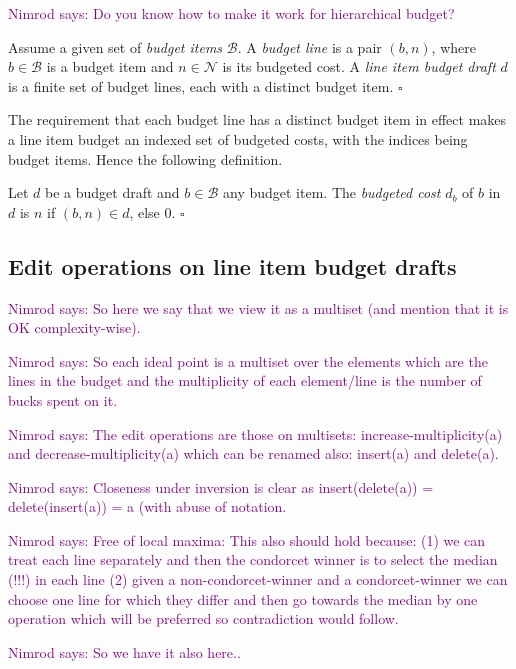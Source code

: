 \documentclass{llncs}
\newcommand{\nimrod}[1]{\textcolor{purple}{Nimrod says: #1}}
\newcommand{\qqed}{\hfill$\square$}
\newcommand{\calB}{\mathcal{B}}
\begin{document}
\nimrod{Do you know how to make it work for hierarchical budget?}

\begin{definition}
Assume a given set of \emph{budget items} $\calB$. A \emph{budget line} is a pair $(b,n)$, where $b \in \calB$ is a budget item and $n \in \mathcal{N}$ is its budgeted cost.  A \emph{line item budget draft} $d$ is a finite set of budget lines, each with a distinct budget item.
\qqed
\end{definition}


The requirement that each budget line has a distinct budget item in effect makes a line item budget an indexed set of budgeted costs, with the indices being
budget items.  Hence the following definition.


\begin{definition}
Let $d$ be a budget draft and $b \in \calB$  any budget item. The \emph{budgeted cost} $d_b$ of $b$ in $d$ is $n$ if $(b,n) \in d$, else 0.
\qqed
\end{definition}


\subsection{Edit operations on line item budget drafts}

\nimrod{So here we say that we view it as a multiset (and mention that it is OK complexity-wise).}

\nimrod{So each ideal point is a multiset over the elements which are the lines in the budget and the multiplicity of each element/line is the number of bucks spent on it.}

\nimrod{The edit operations are those on multisets: increase-multiplicity(a) and decrease-multiplicity(a) which can be renamed also: insert(a) and delete(a).}

\nimrod{Closeness under inversion is clear as insert(delete(a)) = delete(insert(a)) = a (with abuse of notation.}

\nimrod{Free of local maxima: This also should hold because:
  (1) we can treat each line separately and then the condorcet winner is to select the median (!!!) in each line
  (2) given a non-condorcet-winner and a condorcet-winner we can choose one line for which they differ and then go towards the median by one operation which will be preferred so contradiction would follow.}
  
\nimrod{So we have it also here..}
\end{document}
